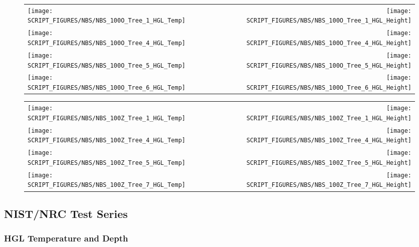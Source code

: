 \begin{figure}[!ht]
\begin{tabular*}{\textwidth}{l@{\extracolsep{\fill}}r}
\texttt{[image: SCRIPT\_FIGURES/NBS/NBS\_100O\_Tree\_1\_HGL\_Temp]} &
\texttt{[image: SCRIPT\_FIGURES/NBS/NBS\_100O\_Tree\_1\_HGL\_Height]} \\
\texttt{[image: SCRIPT\_FIGURES/NBS/NBS\_100O\_Tree\_4\_HGL\_Temp]} &
\texttt{[image: SCRIPT\_FIGURES/NBS/NBS\_100O\_Tree\_4\_HGL\_Height]} \\
\texttt{[image: SCRIPT\_FIGURES/NBS/NBS\_100O\_Tree\_5\_HGL\_Temp]} &
\texttt{[image: SCRIPT\_FIGURES/NBS/NBS\_100O\_Tree\_5\_HGL\_Height]}\\
\texttt{[image: SCRIPT\_FIGURES/NBS/NBS\_100O\_Tree\_6\_HGL\_Temp]} &
\texttt{[image: SCRIPT\_FIGURES/NBS/NBS\_100O\_Tree\_6\_HGL\_Height]}
\end{tabular*}
\end{figure}

\begin{figure}[!ht]
\begin{tabular*}{\textwidth}{l@{\extracolsep{\fill}}r}
\texttt{[image: SCRIPT\_FIGURES/NBS/NBS\_100Z\_Tree\_1\_HGL\_Temp]} &
\texttt{[image: SCRIPT\_FIGURES/NBS/NBS\_100Z\_Tree\_1\_HGL\_Height]} \\
\texttt{[image: SCRIPT\_FIGURES/NBS/NBS\_100Z\_Tree\_4\_HGL\_Temp]} &
\texttt{[image: SCRIPT\_FIGURES/NBS/NBS\_100Z\_Tree\_4\_HGL\_Height]} \\
\texttt{[image: SCRIPT\_FIGURES/NBS/NBS\_100Z\_Tree\_5\_HGL\_Temp]} &
\texttt{[image: SCRIPT\_FIGURES/NBS/NBS\_100Z\_Tree\_5\_HGL\_Height]}\\
\texttt{[image: SCRIPT\_FIGURES/NBS/NBS\_100Z\_Tree\_7\_HGL\_Temp]} &
\texttt{[image: SCRIPT\_FIGURES/NBS/NBS\_100Z\_Tree\_7\_HGL\_Height]}
\end{tabular*}
\end{figure}

\clearpage

\subsection{NIST/NRC Test Series}

\subsubsection{HGL Temperature and Depth}

